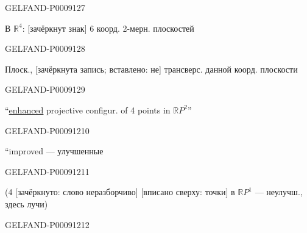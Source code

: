 \begin{GelfandAdjacentEvidence}{GELFAND-P000912}{7}


В $\mathbb R^4$: [зачёркнут знак] 6 коорд. 2-мерн. плоскостей
\end{GelfandAdjacentEvidence}
\begin{GelfandAdjacentEvidence}{GELFAND-P000912}{8}


Плоск., [зачёркнута запись; вставлено: не] трансверс. данной коорд. плоскости
\end{GelfandAdjacentEvidence}
\begin{GelfandAdjacentEvidence}{GELFAND-P000912}{9}


\textquotedblleft\uline{enhanced} projective configur. of 4 points in \(\mathbb R P^2\)\textquotedblright
{}
\end{GelfandAdjacentEvidence}
\begin{GelfandAdjacentEvidence}{GELFAND-P000912}{10}


\textquotedblleft improved --- улучшенные

\end{GelfandAdjacentEvidence}
\begin{GelfandAdjacentEvidence}{GELFAND-P000912}{11}


(4 [зачёркнуто: слово неразборчиво]
[вписано сверху: точки] в \(\mathbb R P^1\) --- неулучш., здесь лучи)

\end{GelfandAdjacentEvidence}
\begin{GelfandAdjacentEvidence}{GELFAND-P000912}{12}

\end{GelfandAdjacentEvidence}



